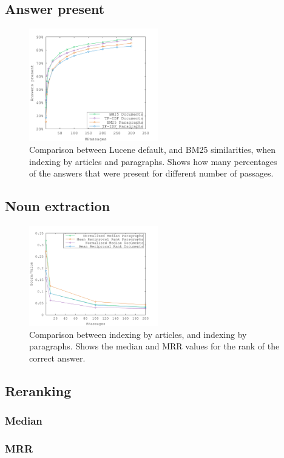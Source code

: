 

\subsection{Answer present}

\begin{figure}[h!]
  \centering
  \includegraphics[width=0.5\textwidth]{figures/bm25_tfdf.pdf}
  \caption{Comparison between Lucene default, and BM25 similarities, when indexing by articles and paragraphs. 
  Shows how many percentages of the answers that were present for different number of passages.}
\end{figure}

\subsection{Noun extraction}

\begin{figure}[h!]
  \centering
  \includegraphics[width=0.5\textwidth]{figures/median.pdf}
  \caption{Comparison between indexing by articles, and indexing by paragraphs. 
  Shows the median and MRR values for the rank of the correct answer.}
\end{figure}

\subsection{Reranking}

\subsubsection{Median}

\subsubsection{MRR}
